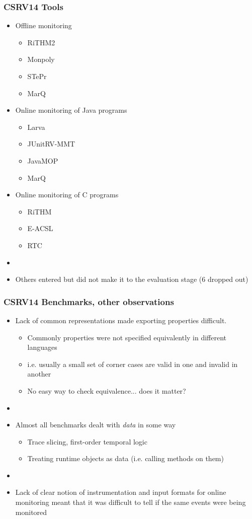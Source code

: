 \documentclass{beamer}
\begin{document}
\begin{frame}
\frametitle{CSRV14 Tools}
\begin{itemize}
	\item  Offline monitoring
	\begin{itemize}
		\item RiTHM2
		\item Monpoly
		\item STePr
		\item MarQ
	\end{itemize}
	\item  Online monitoring of Java programs
	\begin{itemize}
		\item Larva
		\item JUnitRV-MMT
		\item JavaMOP
		\item MarQ
	\end{itemize}	
	\item  Online monitoring of C programs
	\begin{itemize}
		\item RiTHM
		\item E-ACSL
		\item RTC
	\end{itemize}	
	\item[]
	\item Others entered but did not make it to the evaluation stage (6 dropped out)
\end{itemize}
\end{frame}

\begin{frame}
\frametitle{CSRV14 Benchmarks, other observations}
\begin{itemize}
	\item Lack of common representations made exporting properties difficult. 
	\begin{itemize}
		\item Commonly properties were not specified equivalently in different languages
		\item i.e. usually a small set of corner cases are valid in one and invalid in another
		\item No easy way to check equivalence... does it matter?
	\end{itemize}
	\item[]
	\item Almost all benchmarks dealt with \emph{data} in some way
	\begin{itemize}
		\item Trace slicing, first-order temporal logic
		\item Treating runtime objects as data (i.e. calling methods on them)
	\end{itemize}
	\item[]
	\item Lack of clear notion of instrumentation and input formats for online monitoring meant that it was difficult to tell if the same events were being monitored
\end{itemize}
\end{frame}
\end{document}
